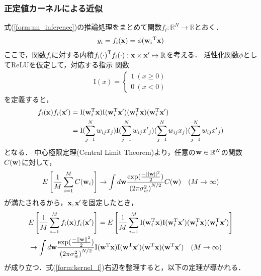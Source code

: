 \documentclass[11pt,a4j]{article}
\begin{document}
      \subsubsection{正定値カーネルによる近似}
        式(\ref{form:nn_inference})の推論処理をまとめて関数$f_i:\mathbb{R}^{N} \to \mathbb{R}$とおく．
        \begin{align}
          y_i = f_i({\bf x}) = \phi( {{\bf w}_i}^{\mathrm{T}} {\bf x} )
        \end{align}
        ここで，関数$f_i$に対する内積${f_i(\cdot)}^{\mathrm{T}} f_i(\cdot): {\bf x} \times {\bf x}' \mapsto \mathbb{R}$を考える．
        活性化関数$\phi$としてReLUを仮定して，対応する指示 関数
        \begin{align}
          {\mathrm{I}}(x) = 
          \begin{cases}
            1 ~ (x \geq 0) \\
            0 ~ (x < 0)
          \end{cases}
        \end{align}
        を定義すると，
        \begin{align}
          {f_i({\bf x})} f_i({\bf x}') 
          &= {\mathrm{I}}( {\bf w}_{i}^{\mathrm{T}} {\bf x} ) {\mathrm{I}}( {\bf w}_{i}^{\mathrm{T}} {\bf x}' ) 
          ( {\bf w}_{i}^{\mathrm{T}} {\bf x} ) ( {\bf w}_{i}^{\mathrm{T}} {\bf x}' ) \\
          &= {\mathrm{I}}(\sum_{j=1}^{N} {w}_{ij} {x}_j) {\mathrm{I}}(\sum_{j=1}^{N} {w}_{ij} {x'}_j)
          ( \sum_{j=1}^{N} {w}_{ij} {x}_j ) ( \sum_{j=1}^{N} {w}_{ij} {x'}_j )          
        \end{align}
        となる．
        中心極限定理(Central Limit Theorem)より，任意の${\bf w} \in \mathbb{R}^{N}$の関数$C({\bf w})$に対して，
        \begin{align}
          E\left[ \frac{1}{M} \sum_{i=1}^{M} C({\bf w}_i) \right] \to
          \int d{\bf w} \frac{\exp (\frac{- {|| {\bf w} ||}^2}{2})}{{(2 \pi \sigma_w^2 )}^{N / 2}}
          C({\bf w}) ~~~ (M \to \infty)
        \end{align}
        が満たされるから，${\bf x}, {\bf x}'$を固定したとき，
        \begin{align}
          &E\left[ \frac{1}{M} \sum_{i=1}^{M} {f_i ({\bf x})} f_i ({\bf x}') \right] 
          = E\left[ \frac{1}{M} \sum_{i=1}^{M} {\mathrm{I}}( {\bf w}_{i}^{\mathrm{T}} {\bf x} ) {\mathrm{I}}( {\bf w}_{i}^{\mathrm{T}} {\bf x}' ) 
          ( {\bf w}_{i}^{\mathrm{T}} {\bf x} ) ( {\bf w}_{i}^{\mathrm{T}} {\bf x}' ) \right] \nonumber \\
          &\to \int d{\bf w} \frac{\exp (\frac{- {|| {\bf w} ||}^2}{2})}{{(2 \pi \sigma_w^2 )}^{N / 2}}
          {\mathrm{I}}( {\bf w}^{\mathrm{T}} {\bf x} ) {\mathrm{I}}( {\bf w}^{\mathrm{T}} {\bf x}' ) 
          ( {\bf w}^{\mathrm{T}} {\bf x} ) ( {\bf w}^{\mathrm{T}} {\bf x}' ) ~~~ (M \to \infty) \label{form:kernel_f} 
        \end{align}
        が成り立つ．式(\ref{form:kernel_f})右辺を整理すると，以下の定理が導かれる．
\end{document}
